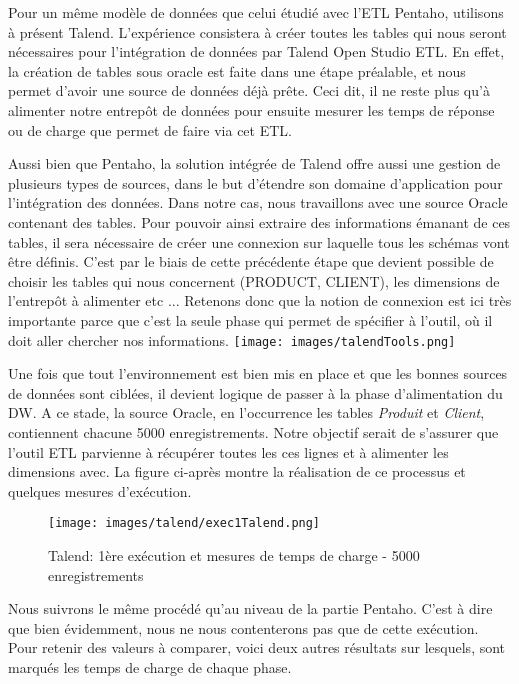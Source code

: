 \documentclass[12pt,a4wide,twoside]{report}
\begin{document}
Pour un même modèle de données que celui étudié avec l'ETL Pentaho, utilisons à présent Talend.\newline
L'expérience consistera à créer toutes les tables qui nous seront nécessaires pour l'intégration de données par Talend Open Studio ETL. En effet, la création de tables sous oracle est faite dans une étape préalable, et nous permet d'avoir une source de données déjà prête. Ceci dit, il ne reste plus qu'à alimenter notre entrepôt de données pour ensuite mesurer les temps de réponse ou de charge que permet de faire via cet ETL.\newline
	\begin{multicols}{2}
Aussi bien que Pentaho, la solution intégrée de Talend offre aussi une gestion de plusieurs types de sources, dans le but d'étendre son domaine d'application pour l'intégration des données. Dans notre cas, nous travaillons avec une source Oracle contenant des tables. Pour pouvoir ainsi extraire des informations émanant de ces tables, il sera nécessaire de créer une connexion sur laquelle tous les schémas vont être définis.\newline
C'est par le biais de cette précédente étape que devient possible de choisir les tables qui nous concernent (PRODUCT, CLIENT), les dimensions de l'entrepôt à alimenter etc ... \newline
Retenons donc que la notion de connexion est ici très importante parce que c'est la seule phase qui permet de spécifier à l'outil, où il doit aller chercher nos informations.
\texttt{[image: images/talendTools.png]}
\end{multicols}
Une fois que tout l'environnement est bien mis en place et que les bonnes sources de données sont ciblées, il devient logique de passer à la phase d'alimentation du DW.\newline
A ce stade, la source Oracle, en l'occurrence les tables \emph{Produit} et \emph{Client}, contiennent chacune 5000 enregistrements. Notre objectif serait de s'assurer que l'outil ETL parvienne à récupérer toutes les ces lignes et à alimenter les dimensions avec. La figure ci-après montre la réalisation de ce processus et quelques mesures d'exécution.
\newpage
		\begin{figure}[!h]
	\begin{center}
		\texttt{[image: images/talend/exec1Talend.png]}
	\end{center}
		\caption{Talend: 1ère exécution et mesures de temps de charge - 5000 enregistrements}
	\end{figure} 
	Nous suivrons le même procédé qu'au niveau de la partie Pentaho. C'est à dire que bien évidemment, nous ne nous contenterons pas que de cette exécution. Pour retenir des valeurs à comparer, voici deux autres résultats sur lesquels, sont marqués les temps de charge de chaque phase.
	
\end{document}
